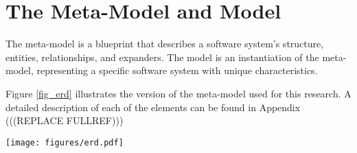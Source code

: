 \section{The Meta-Model and Model} \label{sec_artifact_meta_model}

The meta-model is a blueprint that describes a software system's structure, entities,
relationships, and expanders. The model is an instantiation of the meta-model,
representing a specific software system with unique characteristics. 

Figure \ref{fig_erd} illustrates the version of the meta-model used for this research. A
detailed description of each of the elements can be found in Appendix
(((REPLACE FULLREF)))

\begin{figure*}[ht!]
    \centering
    \centerline{\texttt{[image: figures/erd.pdf]}}
    \caption[The meta-model represented as an Entity Relationship Diagram]{The meta-model represented as an Entity Relationship Diagram}
    \label{fig_erd}
\end{figure*}